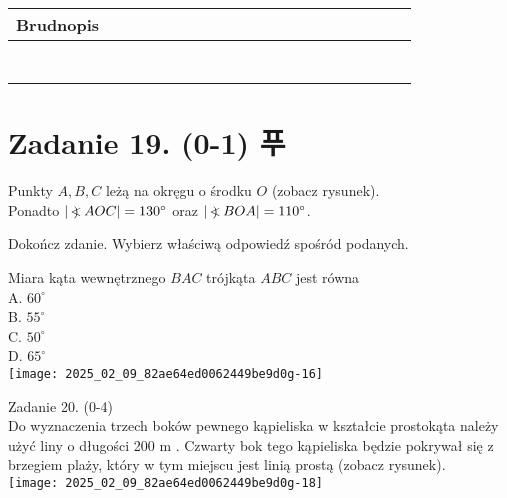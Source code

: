 \documentclass[10pt]{article}
\newcommand\Varangle{\mathop{{<\!\!\!\!\!\text{\small)}}\:}\nolimits}
\begin{document}
\begin{center}
\begin{tabular}{|c|c|c|c|c|c|c|c|c|c|c|c|c|c|c|c|c|c|c|c|c|c|c|}
\hline
\multicolumn{4}{|l|}{Brudnopis} &  &  &  &  &  &  &  &  &  &  &  &  &  &  &  &  &  &  &  \\
\hline
 &  &  &  &  &  &  &  &  &  &  &  &  &  &  &  &  &  &  &  &  &  &  \\
\hline
 &  &  &  &  &  &  &  &  &  &  &  &  &  &  &  &  &  &  &  &  &  &  \\
\hline
 &  &  &  &  &  &  &  &  &  &  &  &  &  &  &  &  &  &  &  &  &  &  \\
\hline
 &  &  &  &  &  &  &  &  &  &  &  &  &  &  &  &  &  &  &  &  &  &  \\
\hline
 &  &  &  &  &  &  &  &  &  &  &  &  &  &  &  &  &  &  &  &  &  &  \\
\hline
 &  &  &  &  &  &  &  &  &  &  &  &  &  &  &  &  &  &  &  &  &  &  \\
\hline
 &  &  &  &  &  &  &  &  &  &  &  &  &  &  &  &  &  &  &  &  &  &  \\
\hline
\end{tabular}
\end{center}

\section*{Zadanie 19. (0-1) 푸}
Punkty \(A, B, C\) leżą na okręgu o środku \(O\) (zobacz rysunek).\\
Ponadto \(|\Varangle A O C|=130^{\circ}\) oraz \(|\Varangle B O A|=110^{\circ}\).

Dokończ zdanie. Wybierz właściwą odpowiedź spośród podanych.

Miara kąta wewnętrznego \(B A C\) trójkąta \(A B C\) jest równa\\
A. \(60^{\circ}\)\\
B. \(55^{\circ}\)\\
C. \(50^{\circ}\)\\
D. \(65^{\circ}\)\\
\texttt{[image: 2025\_02\_09\_82ae64ed0062449be9d0g-16]}

Zadanie 20. (0-4)\\
Do wyznaczenia trzech boków pewnego kąpieliska w kształcie prostokąta należy użyć liny o długości 200 m . Czwarty bok tego kąpieliska będzie pokrywał się z brzegiem plaży, który w tym miejscu jest linią prostą (zobacz rysunek).\\
\texttt{[image: 2025\_02\_09\_82ae64ed0062449be9d0g-18]}
\end{document}
